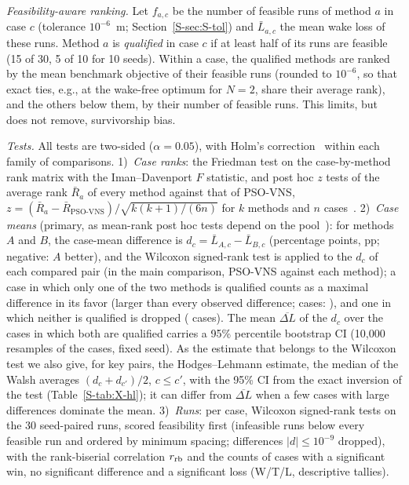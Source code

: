 \emph{Feasibility-aware ranking.} Let $f_{a,c}$ be the number of feasible runs of method $a$ in case $c$ (tolerance $10^{-6}$~m; Section~\ref{S-sec:S-tol}) and $\bar L_{a,c}$ the mean wake loss of these runs. Method $a$ is \emph{qualified} in case $c$ if at least half of its runs are feasible (15 of 30, 5 of 10 for 10 seeds). Within a case, the qualified methods are ranked by the mean benchmark objective of their feasible runs (rounded to $10^{-6}$, so that exact ties, e.g., at the wake-free optimum for $N=2$, share their average rank), and the others below them, by their number of feasible runs. This limits, but does not remove, survivorship bias.

\emph{Tests.} All tests are two-sided ($\alpha=0.05$), with Holm's correction~\cite{Holm1979} within each family of comparisons.
1)~\emph{Case ranks}: the Friedman test on the case-by-method rank matrix with the Iman--Davenport $F$ statistic, and post hoc $z$ tests of the average rank $\bar R_a$ of every method against that of PSO-VNS, $z=(\bar R_a-\bar R_{\text{PSO-VNS}})/\sqrt{k(k+1)/(6n)}$ for $k$ methods and $n$ cases~\cite{Demsar2006,Derrac2011,LaTorre2021}.
2)~\emph{Case means} (primary, as mean-rank post hoc tests depend on the pool~\cite{Benavoli2016}): for methods $A$ and $B$, the case-mean difference is $d_c=\bar L_{A,c}-\bar L_{B,c}$ (percentage points, pp; negative: $A$ better), and the Wilcoxon signed-rank test is applied to the $d_c$ of each compared pair (in the main comparison, PSO-VNS against each method); a case in which only one of the two methods is qualified counts as a maximal difference in its favor (larger than every observed difference; cases: \NCmImputedPhrase), and one in which neither is qualified is dropped (\NCmDropped{} cases). The mean $\overline{\Delta L}$ of the $d_c$ over the cases in which both are qualified carries a 95\% percentile bootstrap CI (10{,}000 resamples of the cases, fixed seed). As the estimate that belongs to the Wilcoxon test we also give, for key pairs, the Hodges--Lehmann estimate, the median of the Walsh averages $(d_c+d_{c'})/2$, $c\le c'$, with the 95\% CI from the exact inversion of the test (Table~\ref{S-tab:X-hl}); it can differ from $\overline{\Delta L}$ when a few cases with large differences dominate the mean.
3)~\emph{Runs}: per case, Wilcoxon signed-rank tests on the 30 seed-paired runs, scored feasibility first (infeasible runs below every feasible run and ordered by minimum spacing; differences $\lvert d\rvert\le10^{-9}$ dropped), with the rank-biserial correlation $r_{\rm rb}$ and the counts of cases with a significant win, no significant difference and a significant loss (W/T/L, descriptive tallies).
